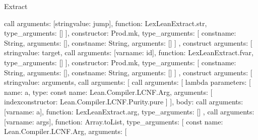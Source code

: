 \begin{lexlean}{Extract}
\begin{toolingmodule}
{{{{{{{                        call{
                          arguments: [string{value: jump}],
                          function: LexLeanExtract.str,
                          type_arguments: []
                        }
                      ],
                      constructor: Prod.mk,
                      type_arguments: [
                        const{name: String, arguments: []},
                        const{name: String, arguments: []}
                      ]
                    },
                    construct{
                      arguments: [
                        string{value: target},
                        call{
                          arguments: [var{name: id}],
                          function: LexLeanExtract.fvar,
                          type_arguments: []
                        }
                      ],
                      constructor: Prod.mk,
                      type_arguments: [
                        const{name: String, arguments: []},
                        const{name: String, arguments: []}
                      ]
                    },
                    construct{
                      arguments: [
                        string{value: arguments},
                        call{
                          arguments: [
                            call{
                              arguments: [
                                lambda{
                                  parameters: [
                                    {
                                      name: a,
                                      type: const{
                                        name: Lean.Compiler.LCNF.Arg,
                                        arguments: [
                                          index{constructor: Lean.Compiler.LCNF.Purity.pure}
                                        ]
                                      }
                                    }
                                  ],
                                  body: call{
                                    arguments: [var{name: a}],
                                    function: LexLeanExtract.arg,
                                    type_arguments: []
                                  }
                                },
                                call{
                                  arguments: [var{name: args}],
                                  function: Array.toList,
                                  type_arguments: [
                                    const{
                                      name: Lean.Compiler.LCNF.Arg,
                                      arguments: [
}}}}}}}}}}}
\end{toolingmodule}
\end{lexlean}
